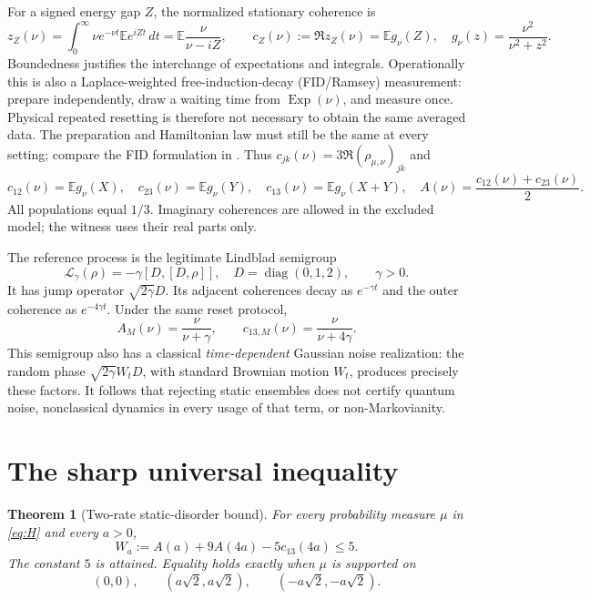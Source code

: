 \documentclass[11pt,a4paper]{article}
\newtheorem{theorem}{Theorem}
\newcommand{\E}{\mathbb E}
\newcommand{\diag}{\operatorname{diag}}
\begin{document}
For a signed energy gap $Z$, the normalized stationary coherence is
\begin{equation}\label{eq:renewal}
 z_Z(\nu)=\int_0^\infty\nu e^{-\nu t}\E e^{iZt}\,dt
 =\E\frac{\nu}{\nu-iZ},\qquad
 c_Z(\nu):=\Re z_Z(\nu)=\E g_\nu(Z),
 \quad g_\nu(z)=\frac{\nu^2}{\nu^2+z^2}.
\end{equation}
Boundedness justifies the interchange of expectations and integrals.
Operationally this is also a Laplace-weighted free-induction-decay
(FID/Ramsey) measurement: prepare independently, draw a waiting time
from $\operatorname{Exp}(\nu)$, and measure once. Physical repeated
resetting is therefore not necessary to obtain the same averaged data.
The preparation and Hamiltonian law must still be the same at every
setting; compare the FID formulation in \cite{chen2018}.
Thus $c_{jk}(\nu)=3\Re(\rho_{\mu,\nu})_{jk}$ and
\begin{equation}\label{eq:features}
 c_{12}(\nu)=\E g_\nu(X),\quad
 c_{23}(\nu)=\E g_\nu(Y),\quad
 c_{13}(\nu)=\E g_\nu(X+Y),\quad
 A(\nu)=\frac{c_{12}(\nu)+c_{23}(\nu)}2.
\end{equation}
All populations equal $1/3$. Imaginary coherences are allowed in the
excluded model; the witness uses their real parts only.

The reference process is the legitimate Lindblad semigroup
\begin{equation}\label{eq:ref}
 \mathcal L_\gamma(\rho)=-\gamma[D,[D,\rho]],\quad
 D=\diag(0,1,2),\qquad\gamma>0.
\end{equation}
It has jump operator $\sqrt{2\gamma}D$. Its adjacent coherences decay
as $e^{-\gamma t}$ and the outer coherence as $e^{-4\gamma t}$.
Under the same reset protocol,
\begin{equation}\label{eq:refdata}
 A_M(\nu)=\frac\nu{\nu+\gamma},\qquad
 c_{13,M}(\nu)=\frac\nu{\nu+4\gamma}.
\end{equation}
This semigroup also has a classical \emph{time-dependent} Gaussian
noise realization: the random phase $\sqrt{2\gamma}W_tD$, with
standard Brownian motion $W_t$, produces precisely these factors.
It follows that rejecting static ensembles does not certify quantum
noise, nonclassical dynamics in every usage of that term, or
non-Markovianity.

\section{The sharp universal inequality}
\begin{theorem}[Two-rate static-disorder bound]\label{thm:witness}
For every probability measure $\mu$ in \eqref{eq:H} and every $a>0$,
\begin{equation}\label{eq:witness}
 W_a:=A(a)+9A(4a)-5c_{13}(4a)\leq5.
\end{equation}
The constant $5$ is attained. Equality holds exactly when $\mu$ is
supported on
\begin{equation}\label{eq:equality}
 (0,0),\qquad(a\sqrt2,a\sqrt2),\qquad(-a\sqrt2,-a\sqrt2).
\end{equation}
\end{theorem}
\end{document}
